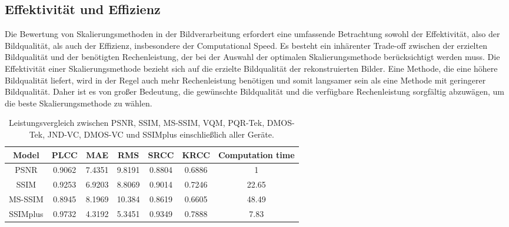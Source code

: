     \subsection{Effektivität und Effizienz}

        Die Bewertung von Skalierungsmethoden in der Bildverarbeitung erfordert eine umfassende Betrachtung sowohl der Effektivität, also der Bildqualität, als auch der Effizienz, insbesondere der Computational Speed. 
        Es besteht ein inhärenter Trade-off zwischen der erzielten Bildqualität und der benötigten Rechenleistung, der bei der Auswahl der optimalen Skalierungsmethode berücksichtigt werden muss.
        Die Effektivität einer Skalierungsmethode bezieht sich auf die erzielte Bildqualität der rekonstruierten Bilder. 
        Eine Methode, die eine höhere Bildqualität liefert, wird in der Regel auch mehr Rechenleistung benötigen und somit langsamer sein als eine Methode mit geringerer Bildqualität. 
        Daher ist es von großer Bedeutung, die gewünschte Bildqualität und die verfügbare Rechenleistung sorgfältig abzuwägen, um die beste Skalierungsmethode zu wählen.


        \begin{table}[!h]
        \centering
        \begin{tabular}{ccccccc}
            \textbf{Model} & \textbf{PLCC} & \textbf{MAE} & \textbf{RMS} & \textbf{SRCC} & \textbf{KRCC} & \textbf{Computation time} \\ \hline
            PSNR           & 0.9062        & 7.4351       & 9.8191       & 0.8804        & 0.6886        & 1                                     \\
            SSIM           & 0.9253        & 6.9203       & 8.8069       & 0.9014        & 0.7246        & 22.65                                 \\
            MS-SSIM        & 0.8945        & 8.1969       & 10.384       & 0.8619        & 0.6605        & 48.49                                 \\
            SSIMplus       & 0.9732        & 4.3192       & 5.3451       & 0.9349        & 0.7888        & 7.83                                  
        \end{tabular}
        \caption{Leistungsvergleich zwischen PSNR, SSIM, MS-SSIM, VQM, PQR-Tek, DMOS-Tek, JND-VC,
DMOS-VC und SSIMplus einschließlich aller Geräte.}
        \label{tab:Leistungsvergleich}
        \end{table}


